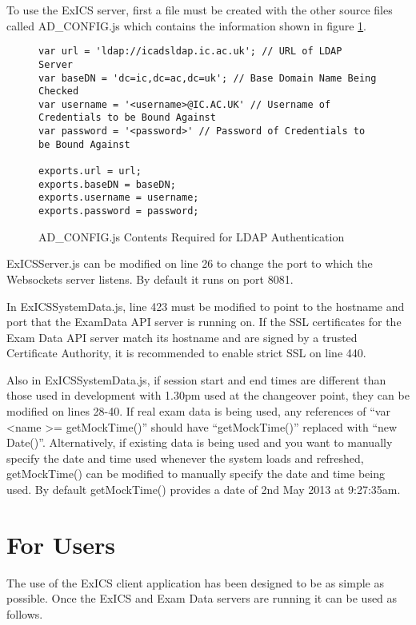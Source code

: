 To use the ExICS server, first a file must be created with the other source files called AD\_CONFIG.js which contains the information shown in figure \ref{fig:ad_conf}.

\begin{figure}[!htbp]
\centering
\lstset{language=JavaScript}
\begin{lstlisting}[tabsize=2,breaklines=true]
var url = 'ldap://icadsldap.ic.ac.uk'; // URL of LDAP Server
var baseDN = 'dc=ic,dc=ac,dc=uk'; // Base Domain Name Being Checked
var username = '<username>@IC.AC.UK' // Username of Credentials to be Bound Against
var password = '<password>' // Password of Credentials to be Bound Against

exports.url = url;
exports.baseDN = baseDN;
exports.username = username;
exports.password = password;
\end{lstlisting}
\caption{AD\_CONFIG.js Contents Required for LDAP Authentication}
\label{fig:ad_conf}
\end{figure}

ExICSServer.js can be modified on line 26 to change the port to which the Websockets server listens.  By default it runs on port 8081.

In ExICSSystemData.js, line 423 must be modified to point to the hostname and port that the ExamData API server is running on.  If the SSL certificates for the Exam Data API server match its hostname and are signed by a trusted Certificate Authority, it is recommended to enable strict SSL on line 440.

Also in ExICSSystemData.js, if session start and end times are different than those used in development with 1.30pm used at the changeover point, they can be modified on lines 28-40.  If real exam data is being used, any references of ``var \textless name \textgreater = getMockTime()'' should have ``getMockTime()'' replaced with ``new Date()''.  Alternatively, if existing data is being used and you want to manually specify the date and time used whenever the system loads and refreshed, getMockTime() can be modified to manually specify the date and time being used.  By default getMockTime() provides a date of 2nd May 2013 at 9:27:35am.

\section{For Users}

The use of the ExICS client application has been designed to be as simple as possible.  Once the ExICS and Exam Data servers are running it can be used as follows.

